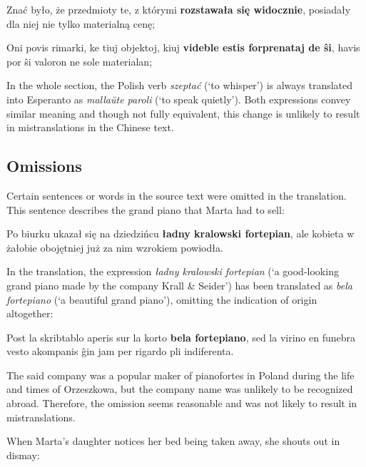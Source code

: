 \begin{displayquote}
Znać było, że przedmioty te, z którymi \textbf{rozstawała się widocznie}, posiadały dla niej nie tylko materialną cenę;
\end{displayquote}

\begin{displayquote}
Oni povis rimarki, ke tiuj objektoj, kiuj \textbf{videble estis forprenataj de ŝi}, havis por ŝi valoron ne sole materialan;
\end{displayquote}

In the whole section, the Polish verb \textit{szeptać} (`to whisper') is always translated into Esperanto as \textit{mallaŭte paroli} (`to speak quietly').
Both expressions convey similar meaning and though not fully equivalent, this change is unlikely to result in mistranslations in the Chinese text.

\subsection{Omissions}

Certain sentences or words in the source text were omitted in the translation.
This sentence describes the grand piano that Marta had to sell:

\begin{displayquote}
Po biurku ukazał się na dziedzińcu \textbf{ładny kralowski fortepian}, ale kobieta w żałobie obojętniej już za nim wzrokiem powiodła.
\end{displayquote}

In the translation, the expression \textit{ładny kralowski fortepian} (`a good-looking grand piano made by the company Krall \& Seider') has been translated as \textit{bela fortepiano} (`a beautiful grand piano'), omitting the indication of origin altogether:

\begin{displayquote}
Post la skribtablo aperis sur la korto \textbf{bela fortepiano}, sed la virino en funebra vesto akompanis ĝin jam per rigardo pli indiferenta.
\end{displayquote}

The said company was a popular maker of pianofortes in Poland during the life and times of Orzeszkowa, but the company name was unlikely to be recognized abroad.
Therefore, the omission seems reasonable and was not likely to result in mistranslations.

When Marta's daughter notices her bed being taken away, she shouts out in dismay:

